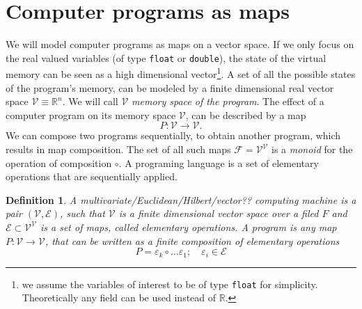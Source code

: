 \documentclass{article}
\newcommand{\RR}{\mathbb{R}}
\newcommand{\E}{\mathcal{E}}
\newcommand{\VV}{\mathcal{V}}
\newcommand{\F}{\mathcal{F}}
\newtheorem{definicija}{Definition}[section]
\begin{document}
\section{Computer programs as maps}
We will model computer programs as maps on a vector space. If
we only focus on the real valued variables (of type \texttt{float} or
\texttt{double}),  the state of the virtual memory can be seen as a high
dimensional vector\footnote{we assume the variables of interest to be of type \texttt{float} for
  simplicity. Theoretically any field can be used instead of $\RR$.}. 
A set of all the possible states of the program's memory,
can be modeled by a finite dimensional real vector space $\VV\equiv \RR^n$. We
will call $\VV$ \emph{memory space of the program}. The effect of a computer
program on its memory space $\VV$, can be described by a map
\begin{equation}
  \label{eq:map}
  P:\VV\to \VV.
\end{equation}
We can compose two programs sequentially, to obtain another program, which
results in map composition. The set of all such maps $\F=\VV^\VV$ is a
\emph{monoid} for the operation of composition $\circ$. A programing language is
a set of elementary operations that are sequentially applied. 
\begin{definicija} A \emph{multivariate/Euclidean/Hilbert/vector?? computing machine} is a pair $(\VV,\E)$, such
  that $\VV$ is a finite dimensional vector space over a filed $F$ and
  $\E\subset \VV^\VV$ is a set of maps, called \emph{elementary operations}. A
  \emph{program} is any map $P:\VV\to \VV$, that can be written as a finite  composition
  of elementary operations
  \begin{equation}
    \label{eq:P_composition}
    P=\varepsilon_k\circ\ldots \varepsilon_1;\quad \varepsilon_i\in \E
  \end{equation}
  
\end{definicija}
\end{document}

